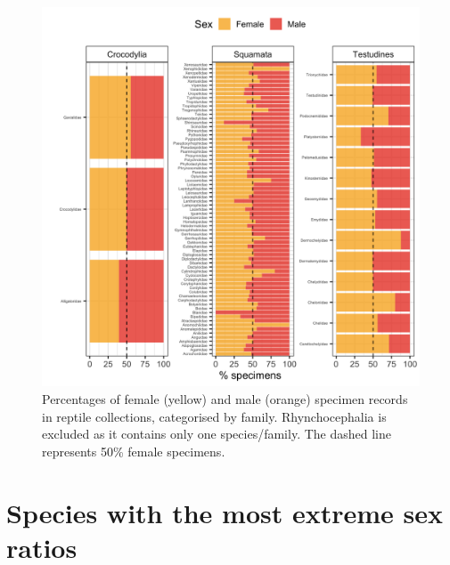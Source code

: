 \documentclass[a4paper, 12pt]{article}
\begin{document}
\begin{figure}[H]
 \centering
  \includegraphics[width = \linewidth]{figures/all-family-reptiles.png}
  \caption{Percentages of female (yellow) and male (orange) specimen records in reptile collections, categorised by family. Rhynchocephalia is excluded as it contains only one species/family. 
  The dashed line represents 50\% female specimens.}
  \label{fig-reptile-family}
\end{figure}

\newpage
\section{Species with the most extreme sex ratios}





\end{document}
